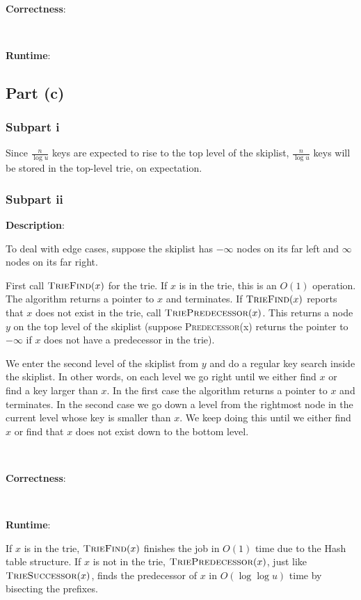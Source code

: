 \documentclass{article}
\begin{document}
~

\noindent\textbf{Correctness}:

~

\noindent\textbf{Runtime}:

\subsection{Part (c)}
\subsubsection{Subpart i}
Since $\frac{n}{\log u}$ keys are expected to rise to the top level of the skiplist, $\frac{n}{\log u}$ keys will be stored in the top-level trie, on expectation.

\subsubsection{Subpart ii}
\noindent\textbf{Description}:

To deal with edge cases, suppose the skiplist has $-\infty$ nodes on its far left and $\infty$ nodes on its far right.

First call $\textsc{TrieFind}(x)$ for the trie. If $x$ is in the trie, this is an $O(1)$ operation. The algorithm returns a pointer to $x$ and terminates. If $\textsc{TrieFind}(x)$ reports that $x$ does not exist in the trie, call $\textsc{TriePredecessor}(x)$. This returns a node $y$ on the top level of the skiplist (suppose \textsc{Predecessor}(x) returns the pointer to $-\infty$ if $x$ does not have a predecessor in the trie).

We enter the second level of the skiplist from $y$ and do a regular key search inside the skiplist. In other words, on each level we go right until we either find $x$ or find a key larger than $x$. In the first case the algorithm returns a pointer to $x$ and terminates. In the second case we go down a level from the rightmost node in the current level whose key is smaller than $x$. We keep doing this until we either find $x$ or find that $x$ does not exist down to the bottom level.

~

\noindent\textbf{Correctness}:

~

\noindent\textbf{Runtime}:

If $x$ is in the trie, $\textsc{TrieFind}(x)$ finishes the job in $O(1)$ time due to the Hash table structure. If $x$ is not in the trie, $\textsc{TriePredecessor}(x)$, just like $\textsc{TrieSuccessor}(x)$, finds the predecessor of $x$ in $O(\log\log u)$ time by bisecting the prefixes.
\end{document}

